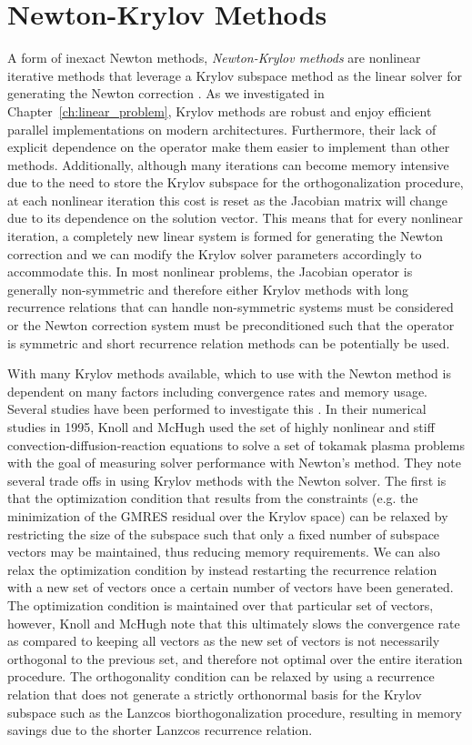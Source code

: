 \section{Newton-Krylov Methods}
\label{sec:newton_krylov_methods}
A form of inexact Newton methods, \textit{Newton-Krylov methods} are
nonlinear iterative methods that leverage a Krylov subspace method as
the linear solver for generating the Newton correction
\citep{kelley_iterative_1995}. As we investigated in
Chapter~\ref{ch:linear_problem}, Krylov methods are robust and enjoy
efficient parallel implementations on modern
architectures. Furthermore, their lack of explicit dependence on the
operator make them easier to implement than other
methods. Additionally, although many iterations can become memory
intensive due to the need to store the Krylov subspace for the
orthogonalization procedure, at each nonlinear iteration this cost is
reset as the Jacobian matrix will change due to its dependence on the
solution vector. This means that for every nonlinear iteration, a
completely new linear system is formed for generating the Newton
correction and we can modify the Krylov solver parameters accordingly
to accommodate this. In most nonlinear problems, the Jacobian operator
is generally non-symmetric and therefore either Krylov methods with
long recurrence relations that can handle non-symmetric systems must be
considered or the Newton correction system must be preconditioned such
that the operator is symmetric and short recurrence relation methods
can be potentially be used.

With many Krylov methods available, which to use with the Newton
method is dependent on many factors including convergence rates and
memory usage. Several studies have been performed to investigate this
\citep{mchugh_inexact_1993,knoll_newton-krylov_1995}. In their
numerical studies in 1995, Knoll and McHugh used the set of highly
nonlinear and stiff convection-diffusion-reaction equations to solve a
set of tokamak plasma problems with the goal of measuring solver
performance with Newton's method. They note several trade offs in using
Krylov methods with the Newton solver. The first is that the
optimization condition that results from the constraints (e.g. the
minimization of the GMRES residual over the Krylov space) can be
relaxed by restricting the size of the subspace such that only a fixed
number of subspace vectors may be maintained, thus reducing memory
requirements. We can also relax the optimization condition by instead
restarting the recurrence relation with a new set of vectors once a
certain number of vectors have been generated. The optimization
condition is maintained over that particular set of vectors, however,
Knoll and McHugh note that this ultimately slows the convergence rate
as compared to keeping all vectors as the new set of vectors is not
necessarily orthogonal to the previous set, and therefore not optimal
over the entire iteration procedure. The orthogonality condition can
be relaxed by using a recurrence relation that does not generate a
strictly orthonormal basis for the Krylov subspace such as the Lanzcos
biorthogonalization procedure, resulting in memory savings due to the
shorter Lanzcos recurrence relation.

